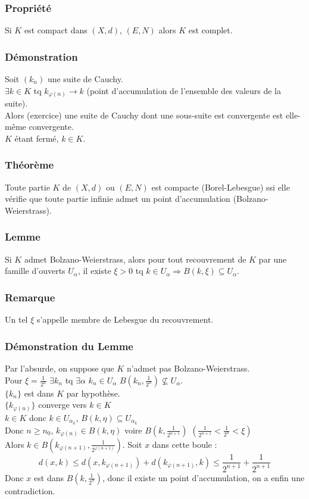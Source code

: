 \documentclass[a4paper, oneside]{report}
\newcommand{\fracun}[1]{\frac{1}{#1}}
\begin{document}
\subsubsection{Propriété}
Si $K$ est compact dans $(X,d)$, $(E,N)$ alors $K$ est complet.

\subsubsection{Démonstration}
Soit $(k_n)$ une suite de Cauchy.\\
$\exists k\in K$ tq $k_{\varphi(n)} \rightarrow k$ (point d'accumulation de l'ensemble des valeurs de la suite).\\
Alors (exercice) une suite de Cauchy dont une sous-suite est convergente est elle-même convergente.\\
$K$ étant fermé, $k\in K$.

\subsubsection{Théorème}
Toute partie $K$ de $(X,d)$ ou $(E,N)$ est compacte (Borel-Lebesgue) ssi elle vérifie que toute partie infinie admet un point d'accumulation (Bolzano-Weierstrass).

\subsubsection{Lemme}
Si $K$ admet Bolzano-Weierstrass, alors pour tout recouvrement de $K$ par une famille d'ouverts $U_\alpha$, il existe $\xi > 0$ tq $k\in U_\alpha \Rightarrow B(k,\xi) \subseteq U_\alpha$.

\subsubsection{Remarque}
Un tel $\xi$ s'appelle membre de Lebesgue du recouvrement.

\subsubsection{Démonstration du Lemme}
Par l'absurde, on suppose que $K$ n'admet pas Bolzano-Weierstrass.\\
Pour $\xi = \fracun{2^n}$ $\exists k_n$ tq $\exists \alpha$ $k_n \in U_\alpha $ $B(k_n, \fracun{2^n}) \nsubseteq U_\alpha$.\\
$\{k_n\}$ est dans $K$ par hypothèse.\\
$\{k_{\varphi(n)}\}$ converge vers $k\in K$\\
$k\in K$ donc $k\in U_{\alpha_k}$, $B(k,\eta) \subseteq U_{\alpha_k}$\\
Donc $n\geq n_0$, $k_{\varphi(n)} \in B(k,\eta)$ voire $B(k,\fracun{2^{n+1}})$ $(\fracun{2^{n+1}} < \fracun{2^n}< \xi)$\\
Alors $k\in B(k_{\varphi(n+1)}, \fracun{2^{\varphi (n+1)}})$. Soit $x$ dans cette boule :
$$d(x,k) \leq d(x,k_{\varphi (n+1)}) + d(k_{\varphi (n+1)}, k) \leq \fracun{2^{n+1}} + \fracun{2^{n+1}}$$
Donc $x$ est dans $B(k,\fracun{2^n})$, donc il existe un point d'accumulation, on a enfin une contradiction.
\end{document}
